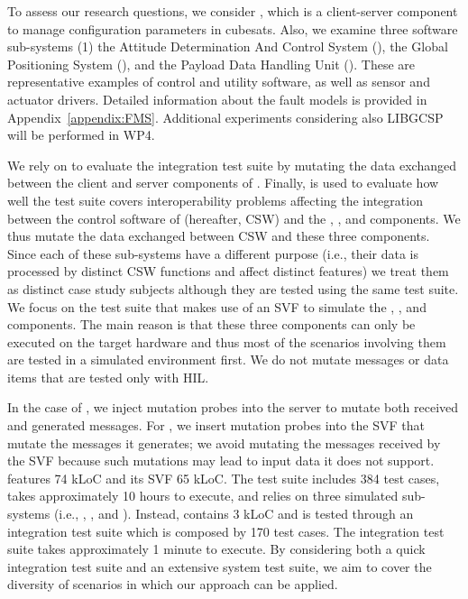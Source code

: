 To assess our research questions, we consider \PARAM, which is a client-server component to manage configuration parameters in cubesats. 
Also, we examine three \ESAIL software sub-systems (1) the Attitude Determination And Control System (\ADCS), the Global Positioning System (\GPS), and the Payload Data Handling Unit (\PDHU). {These are representative examples of control and utility software, as well as sensor and actuator drivers.} Detailed information about the fault models is provided in Appendix~\ref{appendix:FMS}. Additional experiments considering also LIBGCSP will be performed in WP4.

We rely on \APPR to evaluate the \PARAM integration test suite by  mutating the data exchanged between the client and server components of \PARAM. 
Finally, \APPR is used to evaluate how well the 
\ESAIL test suite covers interoperability problems affecting the integration between the control software of \ESAIL (hereafter, CSW) and the \ADCS, \PDHU, and \GPS components. We thus
mutate the data exchanged between \ESAIL CSW and these three components.
Since each of these sub-systems have a  different purpose (i.e., their data is processed by distinct CSW functions and affect distinct \ESAIL features) we treat them as distinct case study subjects although they are tested using the same test suite. We focus on the \ESAIL test suite that makes use of an SVF to simulate the \ADCS, \PDHU, and \GPS components. 
The main reason is that these three components can only be executed on the target hardware and thus most of the scenarios involving them are tested in a simulated environment first.
We do not mutate messages or data items that are tested only with HIL.

In the case of \PARAM, we inject mutation probes into the \PARAM server to mutate both received and generated messages. For \ESAIL, we insert mutation probes into the SVF that mutate the messages it generates; we avoid mutating the messages received by the SVF because such mutations may lead to input data it does not support. 
\ESAIL features 74 kLoC and its SVF 65 kLoC. 
The \ESAIL test suite includes 384 test cases, takes approximately 10 hours to execute, and relies on three simulated
\SVF sub-systems (i.e., \ADCS, \GPS, and \PDHU).
Instead, \PARAM contains 3 kLoC and is tested through an integration test suite which is composed by 170 test cases. 
The \PARAM integration test suite takes approximately 1 minute to execute.
By considering both a quick integration test suite and an extensive system test suite, we aim to cover the diversity of scenarios in which our approach can be applied.



